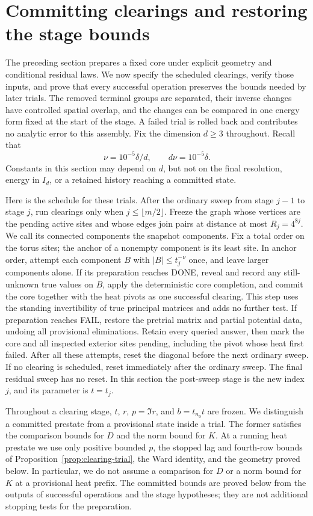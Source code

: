 \section{Committing clearings and restoring the stage bounds}
\label{sec:assembly}

The preceding section prepares a fixed core under explicit geometry and
conditional residual laws. We now specify the scheduled clearings, verify
those inputs, and prove that every successful operation preserves the
bounds needed by later trials. The removed terminal groups are separated,
their inverse changes have controlled spatial overlap, and the changes can
be compared in one energy form fixed at the start of the stage. A failed trial is rolled back
and contributes no analytic error to this assembly.
Fix the dimension $d\ge3$ throughout.  Recall that
\[
 \nu=10^{-5}\delta/d,\qquad d\nu=10^{-5}\delta.
\]
Constants in this section may depend on $d$, but not on the final
resolution, energy in $I_d$, or a retained history reaching a committed state.

Here is the schedule for these trials. After the ordinary sweep from
stage $j-1$ to stage $j$, run clearings only when
$j\le\lfloor m/2\rfloor$. Freeze the graph whose vertices are the
pending active sites and whose edges join pairs at distance at most
$R_j=4^{8j}$. We call its connected components the snapshot components.
Fix a total order on the torus sites; the anchor of a nonempty component
is its least site. In anchor order, attempt each component
$B$ with $|B|\le t_j^{-\nu}$ once, and leave larger components alone.
If its preparation reaches DONE, reveal and record any still-unknown true
values on $B$, apply the deterministic core completion, and commit the
core together with the heat pivots as one successful clearing. This step
uses the standing invertibility of true principal matrices and adds no further
test. If preparation reaches FAIL, restore the pretrial matrix and partial
potential data, undoing all provisional eliminations. Retain every queried
answer, then mark the core and all inspected exterior sites pending, including the
pivot whose heat first failed. After all these attempts, reset the
diagonal before the next ordinary sweep. If no clearing is scheduled,
reset immediately after the ordinary sweep. The final residual sweep
has no reset. In this section the post-sweep stage is the new index
$j$, and its parameter is $t=t_j$.

Throughout a clearing stage, $t$, $r$, $p=\Im r$, and
$b=t_{n_0}t$ are frozen. We distinguish a committed prestate from a
provisional state inside a trial. The former satisfies the comparison
bounds for $D$ and the norm bound for $K$. At a running heat prestate we use
only positive bounded $p$, the stopped lag and fourth-row bounds of
Proposition~\ref{prop:clearing-trial}, the Ward identity, and the geometry
proved below. In particular, we do not assume a comparison for $D$ or a
norm bound for $K$ at a provisional heat prefix. The committed bounds are
proved below from the outputs of successful operations and the stage hypotheses; they are not additional
stopping tests for the preparation.

